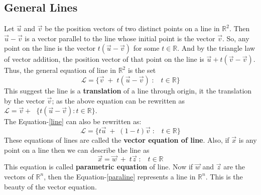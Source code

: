\documentclass[math101_lecturenotes_ku.tex]{subfiles}
\begin{document}
\subsection{General Lines}
Let $\vec{u}$ and $\vec{v}$ be the position vectors of two distinct points on a line in ${\mathbb R}^2$. Then $\vec{u}-\vec{v}$ is a vector parallel to the line whose initial point is the vector $\vec{v}$. So, any point on the line is the vector $t(\vec{u}-\vec{v})$ for some $t \in \mathbb R$. And by the triangle law of vector addition, the position vector of that point on the line is $\vec{u} + t(\vec{v}-\vec{v})$. Thus, the general equation of line in ${\mathbb R}^2$ is the set
\begin{equation}
\label{line}
    \mathcal{L}=\{\vec{v}\; + \;t(\vec{u}-\vec{v})\;: \;\;\; t \in {\mathbb R}\}
\end{equation}
This suggest the line is a \textbf{translation} of a line through origin, it the translation by the vector $\vec{v}$; as the above equation can be rewritten as $\mathcal{L}= \vec{v} + \;\; \{t(\vec{u}-\vec{v}):t \in {\mathbb R}\}$.\\
The Equation-\ref{line} can also be rewritten as:
\begin{equation*}
    \mathcal{L}=\{t \vec{u} \; + \; (1-t)\vec{v} \; : \;\;\;t  \in {\mathbb R}\}
\end{equation*}
These equations of lines are called the \textbf{vector equation of line}. Also, if $\vec{x}$ is any point on a line then we can describe the line as
\begin{equation}
    \label{paraline}
    \vec{x}=\vec{w} \; + \; t \vec{z} \;: \;\;\; t  \in {\mathbb R}
\end{equation}
This equation is called \textbf{parametric equation} of line. Now if $\vec{w}$ and $\vec{z}$ are the vectors of ${\mathbb R}^n$, then the Equation-\ref{paraline} represents a line in ${\mathbb R}^n$. This is the beauty of the vector equation.
\end{document}
